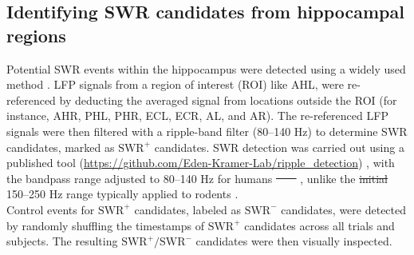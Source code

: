 \documentclass[preprint,review,12pt]{elsarticle}%
\providecommand{\DIFaddtex}[1]{{\protect\color{blue}\uwave{#1}}} %
\providecommand{\DIFdeltex}[1]{{\protect\color{red}\sout{#1}}}                      %
\providecommand{\DIFaddbegin}{} %
\providecommand{\DIFaddend}{} %
\providecommand{\DIFdelbegin}{} %
\providecommand{\DIFdelend}{} %
\providecommand{\DIFadd}[1]{\texorpdfstring{\DIFaddtex{#1}}{#1}} %
\providecommand{\DIFdel}[1]{\texorpdfstring{\DIFdeltex{#1}}{}} %
\newcommand{\DIFscaledelfig}{0.5}
\newlength{\DIFdelgraphicswidth} %
\newlength{\DIFdelgraphicsheight} %
\newcommand{\DIFaddincludegraphics}[2][]{{\color{blue}\fbox{\DIFOincludegraphics[#1]{#2}}}} %
\newcommand{\DIFdelincludegraphics}[2][]{%
\sbox{\DIFdelgraphicsbox}{\DIFOincludegraphics[#1]{#2}}%
\settoboxwidth{\DIFdelgraphicswidth}{\DIFdelgraphicsbox} %
\settoboxtotalheight{\DIFdelgraphicsheight}{\DIFdelgraphicsbox} %
\scalebox{\DIFscaledelfig}{%
\parbox[b]{\DIFdelgraphicswidth}{\usebox{\DIFdelgraphicsbox}\\[-\baselineskip] \rule{\DIFdelgraphicswidth}{0em}}\llap{\resizebox{\DIFdelgraphicswidth}{\DIFdelgraphicsheight}{%
\setlength{\unitlength}{\DIFdelgraphicswidth}%
\begin{picture}(1,1)%
\thicklines\linethickness{2pt} %
{\color[rgb]{1,0,0}\put(0,0){\framebox(1,1){}}}%
{\color[rgb]{1,0,0}\put(0,0){\line( 1,1){1}}}%
{\color[rgb]{1,0,0}\put(0,1){\line(1,-1){1}}}%
\end{picture}%
}\hspace*{3pt}}} %
} %
\DeclareRobustCommand{\DIFaddbegin}{\DIFOaddbegin \let\includegraphics\DIFaddincludegraphics} %
\DeclareRobustCommand{\DIFaddend}{\DIFOaddend \let\includegraphics\DIFOincludegraphics} %
\DeclareRobustCommand{\DIFdelbegin}{\DIFOdelbegin \let\includegraphics\DIFdelincludegraphics} %
\DeclareRobustCommand{\DIFdelend}{\DIFOaddend \let\includegraphics\DIFOincludegraphics} %
\begin{document}
\subsection{Identifying SWR candidates from hippocampal regions}
Potential SWR events within the hippocampus were detected using a widely used method \cite{liu_consensus_2022}. LFP signals from a region of interest (ROI) like AHL, were re-referenced by deducting the averaged signal from locations outside the ROI (for instance, AHR, PHL, PHR, ECL, ECR, AL, and AR). The re-referenced LFP signals were then filtered with a ripple-band filter (80--140 Hz) to determine SWR candidates, marked as $\textrm{SWR}^+$ candidates. SWR detection was carried out using a published tool (\url{https://github.com/Eden-Kramer-Lab/ripple_detection}) \cite{kay_hippocampal_2016}, with the bandpass range adjusted to 80--140 Hz for humans \DIFdelbegin \DIFdel{\mbox{%
\cite{norman_hippocampal_2019} }\hspace{0pt}%
\mbox{%
\cite{norman_hippocampal_2021}}\hspace{0pt}%
}\DIFdelend \DIFaddbegin \DIFadd{\mbox{%
\cite{norman_hippocampal_2019, norman_hippocampal_2021, liu_consensus_2022}}\hspace{0pt}%
}\DIFaddend , unlike the \DIFdelbegin \DIFdel{initial }\DIFdelend \DIFaddbegin \DIFadd{original }\DIFaddend 150--250 Hz range typically applied to rodents \DIFaddbegin \DIFadd{\mbox{%
\cite{foster_reverse_2006, karlsson_awake_2009, carr_hippocampal_2011, pfeiffer_hippocampal_2013, jadhav_awake_2012, singer_hippocampal_2013, buzsaki_hippocampal_2015, wu_hippocampal_2017, fernandez-ruiz_long-duration_2019}}\hspace{0pt}%
}\DIFaddend .
\\
\indent
Control events for $\textrm{SWR}^+$ candidates, labeled as $\textrm{SWR}^-$ candidates, were detected by randomly shuffling the timestamps of $\textrm{SWR}^+$ candidates across all trials and subjects. The resulting $\textrm{SWR}^+/\textrm{SWR}^-$ candidates were then visually inspected.
\DIFdelbegin %
\end{document}
